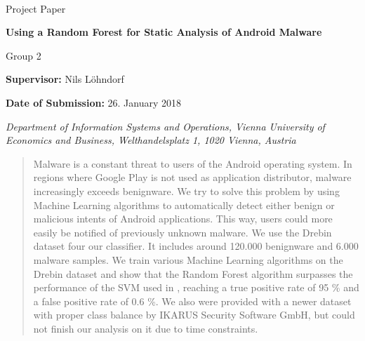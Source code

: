 \documentclass[a4paper, 12pt, twppages]{article}
\begin{document}
\pagebreak

\thispagestyle{fancy}


{\vspace{2cm}~}
{\vspace{2cm}}

{\noindent\large Project Paper}
\vspace{1cm}

{\noindent\huge\textbf{Using a Random Forest for Static Analysis of Android Malware}}

\bigskip

{\noindent\LARGE Group 2}


\bigskip
{\vspace{2cm}}
{\noindent\large {\bf Supervisor:} Nils Löhndorf}

\bigskip

{\noindent\large {\bf Date of Submission:} 26. January 2018}

\bigskip\bigskip\bigskip\bigskip\bigskip\bigskip

{\em\noindent Department of Information Systems and Operations, Vienna University of
Economics and Business, Welthandelsplatz 1, 1020 Vienna, Austria
}


\pagestyle{empty}
\pagebreak
\tableofcontents
\pagebreak
\listoftables
\pagebreak


\begin{abstract}
Malware is a constant threat to users of the Android operating system. In regions where Google Play is not used as application distributor, malware increasingly exceeds benignware. We try to solve this problem by using Machine Learning algorithms to automatically detect either benign or malicious intents of Android applications. This way, users could more easily be notified of previously unknown malware. We use the Drebin dataset \cite{drebin} four our classifier. It includes around 120.000 benignware and 6.000 malware samples. We train various Machine Learning algorithms on the Drebin dataset and show that the Random Forest algorithm surpasses the performance of the SVM used in \cite{drebin}, reaching a true positive rate of 95 \% and a false positive rate of 0.6 \%. We also were provided with a newer dataset with proper class balance by IKARUS Security Software GmbH, but could not finish our analysis on it due to time constraints.
\end{abstract}

\pagebreak







\end{document}
